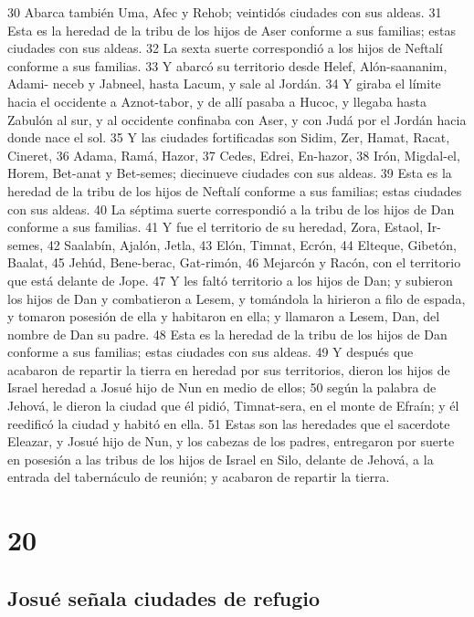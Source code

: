 30 Abarca también Uma, Afec y Rehob; veintidós ciudades con sus aldeas.
31 Esta es la heredad de la tribu de los hijos de Aser conforme a sus familias; estas ciudades con sus aldeas.
32 La sexta suerte correspondió a los hijos de Neftalí conforme a sus familias.
33 Y abarcó su territorio desde Helef, Alón-saananim, Adami- neceb y Jabneel, hasta Lacum, y sale al Jordán.
34 Y giraba el límite hacia el occidente a Aznot-tabor, y de allí pasaba a Hucoc, y llegaba hasta Zabulón al sur, y al occidente confinaba con Aser, y con Judá por el Jordán hacia donde nace el sol.
35 Y las ciudades fortificadas son Sidim, Zer, Hamat, Racat, Cineret,
36 Adama, Ramá, Hazor,
37 Cedes, Edrei, En-hazor,
38 Irón, Migdal-el, Horem, Bet-anat y Bet-semes; diecinueve ciudades con sus aldeas.
39 Esta es la heredad de la tribu de los hijos de Neftalí conforme a sus familias; estas ciudades con sus aldeas.
40 La séptima suerte correspondió a la tribu de los hijos de Dan conforme a sus familias.
41 Y fue el territorio de su heredad, Zora, Estaol, Ir-semes,
42 Saalabín, Ajalón, Jetla,
43 Elón, Timnat, Ecrón,
44 Elteque, Gibetón, Baalat,
45 Jehúd, Bene-berac, Gat-rimón,
46 Mejarcón y Racón, con el territorio que está delante de Jope.
47 Y les faltó territorio a los hijos de Dan; y subieron los hijos de Dan y combatieron a Lesem, y tomándola la hirieron a filo de espada, y tomaron posesión de ella y habitaron en ella; y llamaron a Lesem, Dan, del nombre de Dan su padre. 
48 Esta es la heredad de la tribu de los hijos de Dan conforme a sus familias; estas ciudades con sus aldeas. 
49 Y después que acabaron de repartir la tierra en heredad por sus territorios, dieron los hijos de Israel heredad a Josué hijo de Nun en medio de ellos;
50 según la palabra de Jehová, le dieron la ciudad que él pidió, Timnat-sera, en el monte de Efraín; y él reedificó la ciudad y habitó en ella.
51 Estas son las heredades que el sacerdote Eleazar, y Josué hijo de Nun, y los cabezas de los padres, entregaron por suerte en posesión a las tribus de los hijos de Israel en Silo, delante de Jehová, a la entrada del tabernáculo de reunión; y acabaron de repartir la tierra. 

\chapter{20}

\section*{Josué señala ciudades de refugio}


